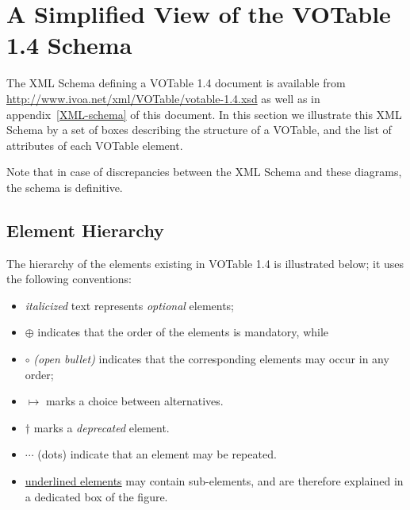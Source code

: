\documentclass[11pt,a4paper]{ivoa}
\def\Arefx#1{appendix~\ref{#1}}
\def\order{$\oplus$ }
\def\unorder{{\large $\circ$ }}
\def\deprecated {$\dagger$ }
\def\choice{{$\mapsto$ }}
\begin{document}
{\clearpage
\section{A Simplified View of the VOTable 1.4 Schema}
\label{dtd}

The XML Schema defining a VOTable 1.4 document
is available from
\url{http://www.ivoa.net/xml/VOTable/votable-1.4.xsd}
as well as in \Arefx{XML-schema} of this document.
In this section we illustrate this XML Schema
by a set of boxes describing the structure of a VOTable,
and the list of attributes of each VOTable element.

Note that in case of discrepancies between the XML Schema and
these diagrams, the schema is definitive.

\subsection{Element Hierarchy}

The hierarchy of the elements existing in VOTable 1.4 is illustrated below;
it uses the following conventions:
\begin{itemize}
\item   {\em italicized} text represents {\em optional} elements;
\item   \order{} indicates that the order of the elements is mandatory, while
\item   \unorder{} {\em(open bullet)} indicates that the corresponding
        elements may occur in any order;
\item   \choice{} marks a choice between alternatives.
\item   \deprecated{} marks a {\em deprecated} element.
\item   $\cdots$ (dots) indicate that an element
        may be repeated.
\item   \underline{underlined elements} may contain sub-elements,
        and are therefore explained in a dedicated box of the figure.
\end{itemize}

\bigskip
\begin{quote}\small

\end{quote}

}
\end{document}
